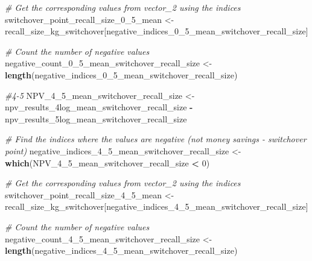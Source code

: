 \documentclass[
]{article}
\newenvironment{Shaded}{\begin{snugshade}}{\end{snugshade}}
\newcommand{\AttributeTok}[1]{\textcolor[rgb]{0.13,0.29,0.53}{#1}}
\newcommand{\CommentTok}[1]{\textcolor[rgb]{0.56,0.35,0.01}{\textit{#1}}}
\newcommand{\DecValTok}[1]{\textcolor[rgb]{0.00,0.00,0.81}{#1}}
\newcommand{\DocumentationTok}[1]{\textcolor[rgb]{0.56,0.35,0.01}{\textbf{\textit{#1}}}}
\newcommand{\FunctionTok}[1]{\textcolor[rgb]{0.13,0.29,0.53}{\textbf{#1}}}
\newcommand{\NormalTok}[1]{#1}
\newcommand{\OtherTok}[1]{\textcolor[rgb]{0.56,0.35,0.01}{#1}}
\newcommand{\SpecialCharTok}[1]{\textcolor[rgb]{0.81,0.36,0.00}{\textbf{#1}}}
\begin{document}
\begin{Shaded}
\begin{Highlighting}[]
\CommentTok{\# Get the corresponding values from vector\_2 using the indices}
\NormalTok{switchover\_point\_recall\_size\_0\_5\_mean }\OtherTok{\textless{}{-}}\NormalTok{ recall\_size\_kg\_switchover[negative\_indices\_0\_5\_mean\_switchover\_recall\_size]}

\CommentTok{\# Count the number of negative values}
\NormalTok{negative\_count\_0\_5\_mean\_switchover\_recall\_size }\OtherTok{\textless{}{-}} \FunctionTok{length}\NormalTok{(negative\_indices\_0\_5\_mean\_switchover\_recall\_size)}


\CommentTok{\#4{-}5}
\NormalTok{NPV\_4\_5\_mean\_switchover\_recall\_size }\OtherTok{\textless{}{-}}\NormalTok{ npv\_results\_4log\_mean\_switchover\_recall\_size }\SpecialCharTok{{-}}\NormalTok{ npv\_results\_5log\_mean\_switchover\_recall\_size}

\CommentTok{\# Find the indices where the values are negative (not money savings {-} switchover point)}
\NormalTok{negative\_indices\_4\_5\_mean\_switchover\_recall\_size }\OtherTok{\textless{}{-}} \FunctionTok{which}\NormalTok{(NPV\_4\_5\_mean\_switchover\_recall\_size }\SpecialCharTok{\textless{}} \DecValTok{0}\NormalTok{)}

\CommentTok{\# Get the corresponding values from vector\_2 using the indices}
\NormalTok{switchover\_point\_recall\_size\_4\_5\_mean }\OtherTok{\textless{}{-}}\NormalTok{ recall\_size\_kg\_switchover[negative\_indices\_4\_5\_mean\_switchover\_recall\_size]}

\CommentTok{\# Count the number of negative values}
\NormalTok{negative\_count\_4\_5\_mean\_switchover\_recall\_size }\OtherTok{\textless{}{-}} \FunctionTok{length}\NormalTok{(negative\_indices\_4\_5\_mean\_switchover\_recall\_size)}
\end{Highlighting}
\end{Shaded}

\begin{Shaded}
\end{Shaded}
\end{document}
